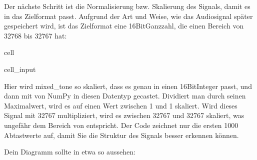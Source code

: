 \documentclass[letterpaper,10pt,english]{jupyterBook}
\begin{document}
\sphinxAtStartPar
Der nächste Schritt ist die Normalisierung bzw. Skalierung des Signals, damit es in das Zielformat passt. Aufgrund der Art und Weise, wie das Audiosignal später gespeichert wird, ist das Zielformat eine 16\sphinxhyphen{}Bit\sphinxhyphen{}Ganzzahl, die einen Bereich von \sphinxhyphen{}32768 bis 32767 hat:

\begin{sphinxuseclass}{cell}\begin{sphinxVerbatimInput}

\begin{sphinxuseclass}{cell_input}
\begin{sphinxVerbatim}[commandchars=\\\{\}]
      
\end{sphinxVerbatim}

\end{sphinxuseclass}\end{sphinxVerbatimInput}

\end{sphinxuseclass}
\sphinxAtStartPar
Hier wird mixed\_tone so skaliert, dass es genau in einen 16\sphinxhyphen{}Bit\sphinxhyphen{}Integer passt, und dann mit  von NumPy in diesen Datentyp gecastet. Dividiert man  durch seinen Maximalwert, wird es auf einen Wert zwischen \sphinxhyphen{}1 und 1 skaliert. Wird dieses Signal mit 32767 multipliziert, wird es zwischen \sphinxhyphen{}32767 und 32767 skaliert, was ungefähr dem Bereich von  entspricht. Der Code zeichnet nur die ersten 1000 Abtastwerte auf, damit Sie die Struktur des Signals besser erkennen können.

\sphinxAtStartPar
Dein Diagramm sollte in etwa so aussehen:
\end{document}
